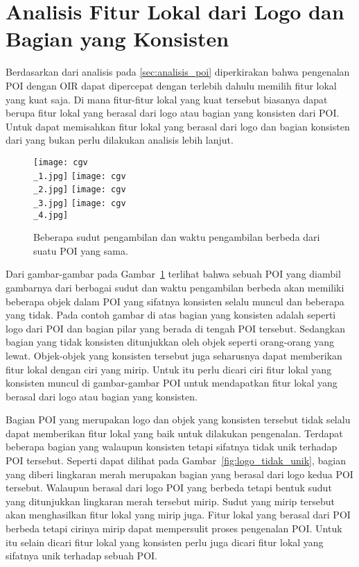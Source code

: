\section{Analisis Fitur Lokal dari Logo dan Bagian yang Konsisten}
\label{sec:analisis_logo}
Berdasarkan dari analisis pada \ref{sec:analisis_poi} diperkirakan bahwa pengenalan POI dengan OIR dapat dipercepat dengan terlebih dahulu memilih fitur lokal yang kuat saja. Di mana fitur-fitur lokal yang kuat tersebut biasanya dapat berupa fitur lokal yang berasal dari logo atau bagian yang konsisten dari POI. Untuk dapat memisahkan fitur lokal yang berasal dari logo dan bagian konsisten dari yang bukan perlu dilakukan analisis lebih lanjut.

\begin{figure}[H]
	\centering
	\texttt{[image: cgv\\\_1.jpg]}
	\texttt{[image: cgv\\\_2.jpg]}
	\texttt{[image: cgv\\\_3.jpg]}
	\texttt{[image: cgv\\\_4.jpg]}
	\caption{Beberapa sudut pengambilan dan waktu pengambilan berbeda dari suatu POI yang sama.}
	\label{fig:objek_konsisten}
\end{figure}

Dari gambar-gambar pada Gambar~\ref{fig:objek_konsisten} terlihat bahwa sebuah POI yang diambil gambarnya dari berbagai sudut dan waktu pengambilan berbeda akan memiliki beberapa objek dalam POI yang sifatnya konsisten selalu muncul dan beberapa yang tidak. Pada contoh gambar di atas bagian yang konsisten adalah seperti logo dari POI dan bagian pilar yang berada di tengah POI tersebut. Sedangkan bagian yang tidak konsisten ditunjukkan oleh objek seperti orang-orang yang lewat. Objek-objek yang konsisten tersebut juga seharusnya dapat memberikan fitur lokal dengan ciri yang mirip. Untuk itu perlu dicari ciri fitur lokal yang konsisten muncul di gambar-gambar POI untuk mendapatkan fitur lokal yang berasal dari logo atau bagian yang konsisten.

Bagian POI yang merupakan logo dan objek yang konsisten tersebut tidak selalu dapat memberikan fitur lokal yang baik untuk dilakukan pengenalan. Terdapat beberapa bagian yang walaupun konsisten tetapi sifatnya tidak unik terhadap POI tersebut. Seperti dapat dilihat pada Gambar~\ref{fig:logo_tidak_unik}, bagian yang diberi lingkaran merah merupakan bagian yang berasal dari logo kedua POI tersebut. Walaupun berasal dari logo POI yang berbeda tetapi bentuk sudut yang ditunjukkan lingkaran merah tersebut mirip. Sudut yang mirip tersebut akan menghasilkan fitur lokal yang mirip juga. Fitur lokal yang berasal dari POI berbeda tetapi cirinya mirip dapat mempersulit proses pengenalan POI. Untuk itu selain dicari fitur lokal yang konsisten perlu juga dicari fitur lokal yang sifatnya unik terhadap sebuah POI.

